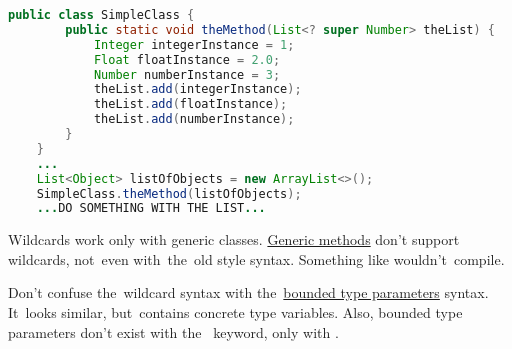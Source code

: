 \begin{lstlisting}[language=Java]
    public class SimpleClass {
        public static void theMethod(List<? super Number> theList) {
            Integer integerInstance = 1;
            Float floatInstance = 2.0;
            Number numberInstance = 3;
            theList.add(integerInstance);
            theList.add(floatInstance);
            theList.add(numberInstance);
        }
    }
    ...
    List<Object> listOfObjects = new ArrayList<>();
    SimpleClass.theMethod(listOfObjects);
    ...DO SOMETHING WITH THE LIST...
\end{lstlisting}

\note Wildcards work only with generic classes.
\hyperref[javagenericmethod]{Generic methods} don't support wildcards, not~even with~the~old style syntax.
Something like  wouldn't~compile.

\warning Don't confuse the~wildcard syntax with the~\hyperref[javagenericsbound]{bounded type parameters} syntax.
It~looks similar, but~contains concrete type variables.
Also, bounded type parameters don't exist with \mbox{the } keyword, only with .
